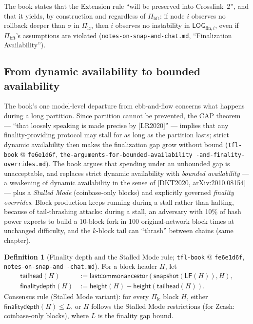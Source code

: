 \documentclass[11pt,a4paper]{article}
\theoremstyle{definition}
\newtheorem{definition}[theorem]{Definition}
\begin{document}
The book states that the Extension rule ``will be preserved into
Crosslink~2'', and that it yields, by construction and regardless of
$\Pi_{\mathrm{bft}}$: if node $i$ observes no rollback deeper than
$\sigma$ in $\Pi_{\mathrm{lc}}$, then $i$ observes no instability in
$\mathsf{LOG}_{\mathrm{fin},i}$, even if $\Pi_{\mathrm{bft}}$'s
assumptions are violated (\texttt{notes-on-snap-and-chat.md},
``Finalization Availability'').

\subsection{From dynamic availability to bounded availability}
\label{sec:xl-bounded-availability}

The book's one model-level departure from ebb-and-flow concerns what
happens during a long partition. Since partition cannot be prevented, the
CAP theorem --- ``that loosely speaking is made precise by [LR2020]'' ---
implies that any finality-providing protocol may stall for as long as the
partition lasts; strict dynamic availability then makes the finalization
gap grow without bound (\texttt{tfl-book} @ \texttt{fe6e1d6f},
\texttt{the-arguments-for-bounded-availability\allowbreak
-and-finality-overrides.md}). The book argues that spending under an
unbounded gap is unacceptable, and replaces strict dynamic availability
with \emph{bounded availability} --- a weakening of dynamic availability
in the sense of [DKT2020, arXiv:2010.08154] --- plus a \emph{Stalled Mode}
(coinbase-only blocks) and explicitly governed \emph{finality overrides}.
Block production keeps running during a stall rather than halting, because
of tail-thrashing attacks: during a stall, an adversary with 10\% of hash
power expects to build a 10-block fork in 100 original-network block
times at unchanged difficulty, and the $k$-block tail
can ``thrash'' between chains (same chapter).

\begin{definition}[Finality depth and the Stalled Mode rule;
\texttt{tfl-book} @ \texttt{fe6e1d6f},
\texttt{notes\allowbreak-on\allowbreak-snap\allowbreak-and\allowbreak
-chat.md}]\label{def:xl-finality-depth}
For a block header $H$, let
\begin{align*}
\mathsf{tailhead}(H) &:=
  \mathsf{lastcommonancestor}(\mathsf{snapshot}(\mathsf{LF}(H)), H), \\
\mathsf{finalitydepth}(H) &:=
  \mathsf{height}(H) - \mathsf{height}(\mathsf{tailhead}(H)).
\end{align*}
Consensus rule (Stalled Mode variant): for every $\Pi_{\mathrm{lc}}$ block
$H$, either $\mathsf{finalitydepth}(H) \le L$, or $H$ follows the Stalled
Mode restrictions (for Zcash: coinbase-only blocks), where $L$ is the
finality gap bound.
\end{definition}
\end{document}
